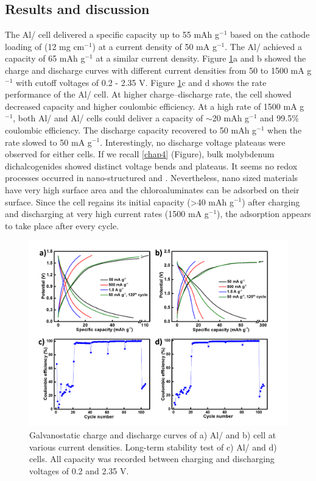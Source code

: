 \subsection{Results and discussion}
The Al/ cell delivered a specific capacity up to 55 mAh g$^{-1}$ based on the cathode loading of  (12 mg cm$^{-1}$) at a current density of 50 mA g$^{-1}$. The Al/ achieved a  capacity of 65 mAh g$^{-1}$ at a similar current density. Figure \ref{Figures/chap6fig:MoX2YNCDCsCEs}a and b showed the charge and discharge curves with different current densities from 50 to 1500 mA g$^{-1}$ with cutoff voltages of 0.2 - 2.35 V. Figure \ref{Figures/chap6fig:MoX2YNCDCsCEs}c and d shows the rate performance of the Al/ cell. At higher charge–discharge rate, the cell showed decreased capacity and higher coulombic efficiency. At a high rate of 1500 mA g$^{-1}$, both Al/ and Al/ cells could deliver a capacity of $\sim$20 mAh g$^{-1}$ and 99.5\% coulombic efficiency. The discharge capacity recovered to 50 mAh g$^{-1}$ when the rate slowed to 50 mA g$^{-1}$. Interestingly, no discharge voltage plateaus were observed for either cells. If we recall \ref{chap4} (Figure), bulk molybdenum dichalcogenides showed distinct voltage bends and plateaus. It seems no redox processes occurred in nano-structured  and . Nevertheless, nano sized materials have very high surface area and the chloroaluminates can be adsorbed on their surface. Since the cell regains its initial capacity (>40 mAh g$^{-1}$) after charging and discharging at very high current rates (1500 mA g$^{-1}$), the adsorption appears to take place after every cycle.  

\begin{figure}[h!]
  \centering
  \includegraphics[width=\textwidth]{Figures/chap6fig/MoX2YNCDCsCEs}
    \caption{Galvanostatic charge and discharge curves of a) Al/ and b)  cell at various current densities. Long-term stability test of c) Al/ and d)  cells. All capacity was recorded between charging and discharging voltages of 0.2 and 2.35 V.}
  \label{Figures/chap6fig:MoX2YNCDCsCEs}
\end{figure}



